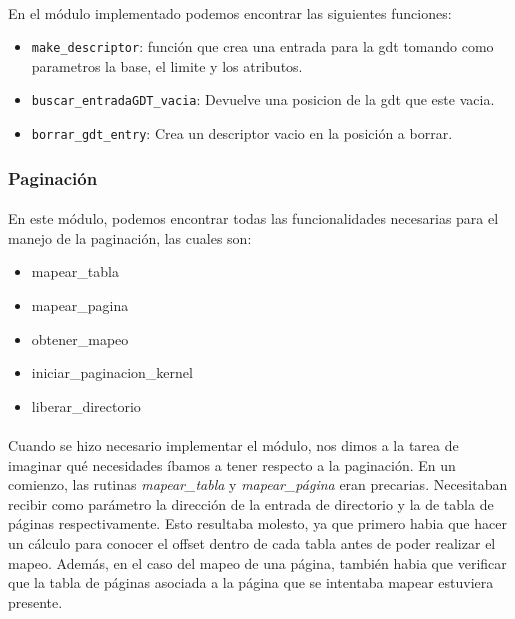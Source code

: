 \documentclass[11pt, a4paper]{article}
\begin{document}
	\paragraph{}
	En el módulo implementado podemos encontrar las siguientes funciones:

	\begin{itemize}
		\item \texttt{make\_descriptor}: función que crea una entrada para la gdt tomando como parametros la base, el limite y los atributos.
		\item \texttt{buscar\_entradaGDT\_vacia}: Devuelve una posicion de la gdt que este vacia.
		\item \texttt{borrar\_gdt\_entry}: Crea un descriptor vacio en la posición a borrar.
	\end{itemize}

\subsubsection{Paginación}
\label{pag}
	\paragraph{}
	En este módulo, podemos encontrar todas las funcionalidades necesarias para el manejo de la paginación, las cuales son:
	
	\begin{itemize}
		\item mapear\_tabla
		\item mapear\_pagina
		\item obtener\_mapeo
		\item iniciar\_paginacion\_kernel
		\item liberar\_directorio
	\end{itemize}

	\paragraph{}
	Cuando se hizo necesario implementar el módulo, nos dimos a la tarea de imaginar qué necesidades íbamos a tener respecto a la paginación. En un comienzo, las rutinas \textit{mapear\_tabla} y \textit{mapear\_página} eran precarias. Necesitaban recibir como parámetro la dirección de la entrada de directorio y la de tabla de páginas respectivamente. Esto resultaba molesto, ya que primero habia que hacer un cálculo para conocer el offset dentro de cada tabla antes de poder realizar el mapeo. Además, en el caso del mapeo de una página, también habia que verificar que la tabla de páginas asociada a la página que se intentaba mapear estuviera presente.
\end{document}

